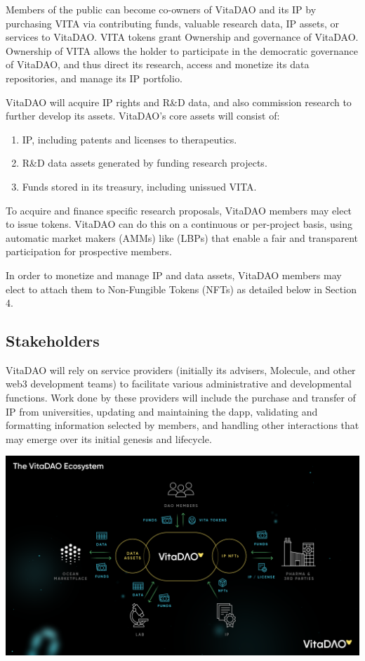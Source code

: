 \documentclass[12pt,letterpaper]{article}
\begin{document}
Members of the public can become co-owners of VitaDAO and its IP by purchasing VITA via contributing funds, valuable research data, IP assets, or services to VitaDAO. VITA tokens grant Ownership and governance of VitaDAO. Ownership of VITA allows the holder to participate in the democratic governance of VitaDAO, and thus direct its research, access and monetize its data repositories, and manage its IP portfolio.

VitaDAO will acquire IP rights and R\&D data, and also commission research to further develop its assets. VitaDAO's core assets will consist of:
\begin{enumerate}
\item IP, including patents and licenses to therapeutics.
\item R\&D data assets generated by funding research projects.
\item Funds stored in its treasury, including unissued VITA.
\end{enumerate}

To acquire and finance specific research proposals, VitaDAO members may elect to issue tokens. VitaDAO can do this on a continuous or per-project basis, using automatic market makers (AMMs) like  (LBPs) that enable a fair and transparent participation for prospective members. 

In order to monetize and manage IP and data assets, VitaDAO members may elect to attach them to Non-Fungible Tokens (NFTs) as detailed below in Section 4.

\subsection{Stakeholders}
VitaDAO will rely on service providers (initially its advisers, Molecule, and other web3 development teams) to facilitate various administrative and developmental functions. Work done by these providers will include the purchase and transfer of IP from universities, updating and maintaining the dapp, validating and formatting information selected by members, and handling other interactions that may emerge over its initial genesis and lifecycle.

\vspace{15pt}
\begin{center}
\includegraphics[width=\linewidth]{images/VitaDAO Diagram - Ecosystem-p-1600.png} 
\end{center}
\end{document}
